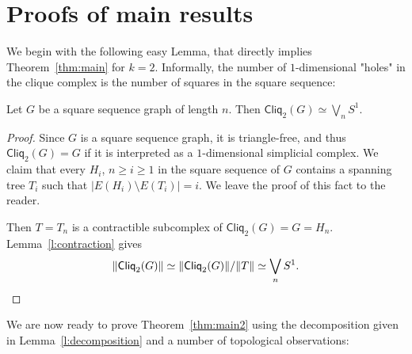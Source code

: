 \documentclass[a4paper, v2021]{lipics-v2021}
\theoremstyle{plain}
\theoremstyle{definition}
\newcommand{\Cliq}[2]{\mathsf{Cliq}_{#1}(#2)}
\DeclarePairedDelimiter{\gr}{\lVert}{\rVert}
\begin{document}
\section{Proofs of main results}\label{s:Proofs}
We begin with the following easy Lemma, that directly implies Theorem~\ref{thm:main} for $k = 2$. Informally, the number of $1$-dimensional "holes" in the clique complex is the number of squares in the square sequence:
\begin{lemma}\label{l:clique}
Let $G$ be a square sequence graph of length $n$. Then $
\Cliq{2}{G} \simeq \bigvee_{n} S^{1}$.
\end{lemma}
\begin{proof}
 Since $G$ is a square sequence graph, it is triangle-free, and thus $\Cliq{2}{G} = G$ if it is interpreted as a $1$-dimensional simplicial complex. We claim that every $H_i$, $n\geq i\geq 1$ in the square sequence of $G$ contains a spanning tree $T_i$ such that $|E(H_i)\setminus E(T_i)| = i$. We leave the proof of this fact to the reader.

Then $T=T_n$ is a contractible subcomplex of $\Cliq{2}{G} = G = H_n$. Lemma~\ref{l:contraction} gives
\[
\gr{\Cliq{2}{G}} \simeq \gr{\Cliq{2}{G}}/ \gr{T} \simeq \bigvee_{n} S^{1}.
\]
\end{proof}

We are now ready to prove Theorem~\ref{thm:main2} using the decomposition given in Lemma~\ref{l:decomposition} and a number of topological observations:
\end{document}
